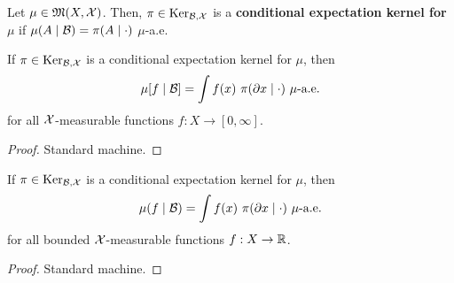 \begin{definition}
    \label{def:cond-exp-ker}
    \leanok{}

    Let $\mu\in\mathfrak{M}(X,\mathcal X)$. Then, $\pi\in\text{Ker}_{\mathcal B,\mathcal X}$ is a \textbf{conditional expectation kernel for $\mu$} if $\mu(A\mid \mathcal B)=\pi(A\mid\cdot)$ $\mu$-a.e.
\end{definition}

\begin{lemma}
    \label{lem:cond-exp-proper-ker-lintegral}

    If $\pi \in \text{Ker}_{\mathcal B, \mathcal X}$ is a conditional expectation kernel for $\mu$, then
    \[\mu[f\mid \MCB] = \int f(x)\ \pi(\partial x\mid\cdot)\ \mu\text{-a.e.}\]
    for all $\mathcal X$-measurable functions $f : X \to [0, \infty]$.
\end{lemma}
\begin{proof}

    Standard machine.
\end{proof}

\begin{lemma}
    \label{lem:cond-exp-proper-ker-integral}
    \leanok

    If $\pi \in \text{Ker}_{\mathcal B, \mathcal X}$ is a conditional expectation kernel for $\mu$, then
    $$\mu(f\mid \MCB) = \int f(x)\ \pi(\partial x\mid\cdot)\ \mu\text{-a.e.}$$
    for all bounded $\mathcal X$-measurable functions $f : X \to \mathbb R$.
\end{lemma}
\begin{proof}

    Standard machine.
\end{proof}

